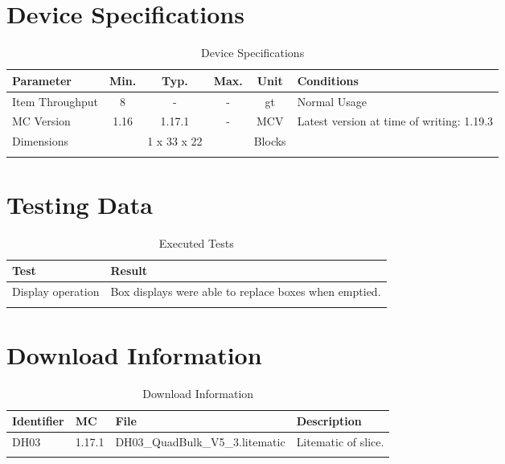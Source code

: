 \documentclass[10pt]{datasheet}
\begin{document}
\section{Device Specifications}

\begin{table}[h]
    \caption{Device Specifications}
    \begin{tabularx}{\textwidth}{l | c c c | c | X}
        \thickhline
        \textbf{Parameter} & \textbf{Min.} & \textbf{Typ.} & \textbf{Max.} &
        \textbf{Unit} & \textbf{Conditions} \\
        \hline
        Item Throughput  & 8 & - & - & gt & Normal Usage \\
        \hline
        MC Version & 1.16 & 1.17.1 & - & MCV & Latest version at time of writing: 1.19.3\\
        \hline
        Dimensions & & 1 x 33 x 22 & & Blocks & \\
        \thickhline
\end{tabularx}
\end{table}
\newpage
\section{Testing Data}
\begin{table}[h]
\caption{Executed Tests}
\begin{tabularx}{\textwidth}{l | X}
    \thickhline
    \textbf{Test} & \textbf{Result} \\
    \hline
    Display operation & Box displays were able to replace boxes when emptied. \\
    \thickhline
\end{tabularx}
\end{table}

\section{Download Information}
\begin{table}[h]
    \caption{Download Information}
    \begin{tabularx}{\textwidth}{l | l | l | X}
        \thickhline
        \textbf{Identifier} & \textbf{MC} & \textbf{File} & \textbf{Description} \\
        \hline
        DH03 & 1.17.1 & DH03\_QuadBulk\_V5\_3.litematic & Litematic of slice. \\
        \hline
        \thickhline
    \end{tabularx}
\end{table}
\end{document}
